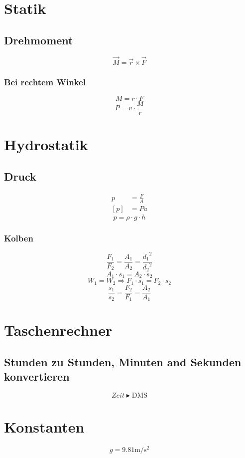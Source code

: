 \documentclass[a4paper]{IEEEtran}
\begin{document}
  \section{Statik}
  \subsection{Drehmoment}
  \begin{equation}
    \vec{M} = \vec{r} \times \vec{F}
  \end{equation}
  \subsubsection{Bei rechtem Winkel}
  \begin{equation}
    M = r \cdot F
  \end{equation}
  \begin{equation}
    P = v \cdot \frac{M}{r}
  \end{equation}

  \section{Hydrostatik}
  \subsection{Druck}
  \begin{align}
    p &= \frac{F}{A} \\
    [p] &= Pa
  \end{align}
  \begin{equation}
    p = \rho \cdot g \cdot h
  \end{equation}
  
  \subsubsection{Kolben}
  \begin{equation}
    \frac{F_1}{F_2} = \frac{A_1}{A_2} = \frac{{d_1}^2}{{d_2}^2}    
  \end{equation}
  \begin{equation}
    A_1 \cdot s_1 = A_2 \cdot s_2
  \end{equation}
  \begin{equation}
    W_1 = W_2 \Rightarrow F_1 \cdot s_1 = F_2 \cdot s_2
  \end{equation}
  \begin{equation}
    \frac{s_1}{s_2} = \frac{F_2}{F_1} = \frac{A_2}{A_1} 
  \end{equation}

  \section{Taschenrechner}
  \subsection{Stunden zu Stunden, Minuten and Sekunden konvertieren}
  \begin{equation}
    Zeit \blacktriangleright \mbox{DMS}
  \end{equation}

  \section{Konstanten}
  \begin{equation}
    g = 9.81 \si{\metre\per\square\second}
  \end{equation}
\end{document}
